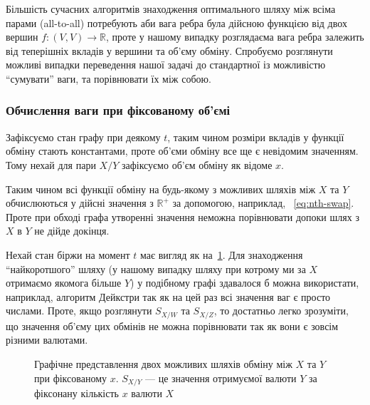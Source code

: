 \documentclass[a4paper, 12pt]{article}
\begin{document}
Більшість сучасних алгоритмів знаходження оптимального шляху між всіма парами
(all-to-all) потребують аби вага ребра була дійсною функцією від двох вершин
$f: (V, V) \to \mathbb{R}$, проте у нашому випадку розглядаєма вага ребра залежить від
теперішніх вкладів у вершини та об'єму обміну. Спробуємо розглянути можливі
випадки переведення нашої задачі до стандартної із можливістю ``сумувати'' ваги, та
порівнювати їх між собою.

\subsubsection{Обчислення ваги при фіксованому об'ємі}

Зафіксуємо стан графу при деякому $t$, таким чином розміри вкладів у функції
обміну стають константами, проте об'єми обміну все ще є невідомим значенням.
Тому нехай для пари $X/Y$ зафіксуємо об'єм обміну як відоме $x$.

Таким чином всі функції обміну на будь-якому з можливих шляхів між $X$ та $Y$
обчислюються у дійсні значення з $\mathbb{R}^{+}$ за допомогою, наприклад,
~\eqref{eq:nth-swap}. Проте при обході графа утворенні значення неможна
порівнювати допоки шлях з $X$ в $Y$ не дійде докінця.

Нехай стан біржи на момент $t$ має вигляд як на~\ref{fig:eval-func-graph}. Для
знаходження ``найкоротшого'' шляху (у нашому випадку шляху при котрому ми за $X$
отримаємо якомога більше $Y$) у подібному графі здавалося б можна використати,
наприклад, алгоритм Дейкстри \cite{dijkstra} так як на цей раз всі значення ваг
є просто числами. Проте, якщо розглянути $S_{X/W}$ та $S_{X/Z}$, то достатньо
легко зрозуміти, що значення об'єму цих обмінів не можна порівнювати так як вони
є зовсім різними валютами.

\begin{figure}[h]
	\centering
	\caption{Графічне представлення двох можливих шляхів обміну між $X$ та $Y$
	  при фіксованому $x$. $S_{X/Y}$ --- це значення отримуємої валюти $Y$ за
	  фіксонану кількість $x$ валюти $X$}
	\label{fig:eval-func-graph}
 \end{figure}
\end{document}
